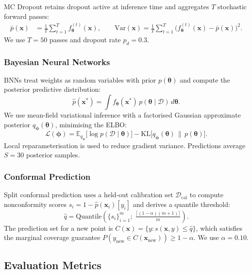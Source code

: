 \documentclass[11pt,a4paper]{article}
\newcommand{\calD}{\mathcal{D}}
\newcommand{\bx}{\mathbf{x}}
\newcommand{\btheta}{\boldsymbol{\theta}}
\newcommand{\hatP}{\hat{p}}
\begin{document}
MC Dropout \citep{gal2016} retains dropout active at inference time and aggregates $T$ stochastic forward passes:
\begin{align}
  \bar{p}(\bx) &= \frac{1}{T} \sum_{t=1}^T f_{\btheta}^{(t)}(\bx), \qquad
  \mathrm{Var}(\bx) = \frac{1}{T} \sum_{t=1}^T \bigl(f_{\btheta}^{(t)}(\bx) - \bar{p}(\bx)\bigr)^2.
\end{align}
We use $T=50$ passes and dropout rate $p_d = 0.3$.

\subsubsection{Bayesian Neural Networks}

BNNs treat weights as random variables with prior $p(\btheta)$ and compute the posterior predictive distribution:
\begin{equation}
  \hatP(\bx^*) = \int f_{\btheta}(\bx^*)\, p(\btheta \mid \calD)\, d\btheta.
\end{equation}
We use mean-field variational inference \citep{blundell2015} with a factorised Gaussian approximate posterior $q_{\bm\phi}(\btheta)$, minimising the ELBO:
\begin{equation}
  \mathcal{L}(\bm\phi) = \mathbb{E}_{q_{\bm\phi}}\bigl[\log p(\calD \mid \btheta)\bigr] - \mathrm{KL}\bigl[q_{\bm\phi}(\btheta) \,\|\, p(\btheta)\bigr].
\end{equation}
Local reparameterisation \citep{kingma2015local} is used to reduce gradient variance. Predictions average $S=30$ posterior samples.

\subsubsection{Conformal Prediction}

Split conformal prediction \citep{papadopoulos2002} uses a held-out calibration set $\calD_{\text{cal}}$ to compute nonconformity scores $s_i = 1 - \hatP(\bx_i)[y_i]$ and derives a quantile threshold:
\begin{equation}
  \hat{q} = \mathrm{Quantile}\!\left(\{s_i\}_{i=1}^m;\; \tfrac{\lceil(1-\alpha)(m+1)\rceil}{m}\right).
\end{equation}
The prediction set for a new point is $C(\bx) = \{y : s(\bx,y) \leq \hat{q}\}$, which satisfies the marginal coverage guarantee $P(y_{\text{new}} \in C(\bx_{\text{new}})) \geq 1-\alpha$. We use $\alpha = 0.10$.

\subsection{Evaluation Metrics}
\end{document}
